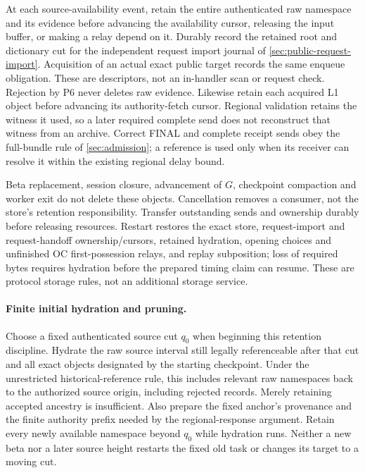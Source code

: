 At each source-availability event, retain the entire authenticated raw
namespace and its evidence before advancing the availability cursor,
releasing the input buffer, or making a relay depend on it. Durably
record the retained root and dictionary cut for the independent request
import journal of \cref{sec:public-request-import}. Acquisition of an
actual exact public target records the same enqueue obligation. These
are descriptors, not an in-handler scan or request check. Rejection
by P6 never deletes raw evidence. Likewise retain each acquired L1
object before advancing its authority-fetch cursor. Regional validation
retains the witness it used, so a later required complete send does not
reconstruct that witness from an archive. Correct FINAL and complete
receipt sends obey the full-bundle rule of \cref{sec:admission}; a
reference is used only when its receiver can resolve it within the
existing regional delay bound.

Beta replacement, session closure, advancement of $G$, checkpoint
compaction and worker exit do not delete these objects. Cancellation
removes a consumer, not the store's retention responsibility. Transfer
outstanding sends and ownership durably before releasing resources.
Restart restores the exact store, request-import and request-handoff
ownership/cursors, retained hydration, opening choices and unfinished OC
first-possession relays, and
replay subposition; loss of required
bytes requires hydration before the prepared timing claim can resume.
These are protocol storage rules, not an additional storage service.

\paragraph{Finite initial hydration and pruning.}
\label{sec:source-hydration}
Choose a fixed authenticated source cut $q_0$ when beginning this
retention discipline. Hydrate the raw source interval still legally
referenceable after that cut and all exact objects designated by the
starting checkpoint. Under the unrestricted historical-reference rule,
this includes relevant raw namespaces back to the authorized source
origin, including rejected records. Merely retaining accepted ancestry
is insufficient. Also prepare the fixed anchor's provenance and the
finite authority prefix needed by the regional-response argument.
Retain every newly available namespace beyond $q_0$ while hydration
runs. Neither a new beta nor a later source height restarts the fixed
old task or changes its target to a moving cut.

